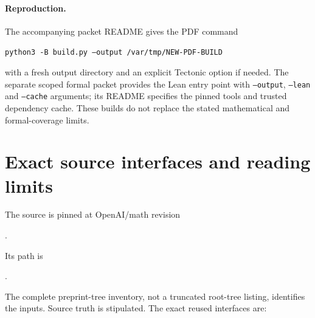 \documentclass[11pt]{article}
\theoremstyle{remark}\newtheorem{remark}[theorem]{Remark}
\numberwithin{equation}{section}
\begin{document}
\paragraph{Reproduction.}
The accompanying packet README gives the PDF command
\begin{center}\small
\texttt{python3 -B build.py --output /var/tmp/NEW-PDF-BUILD}
\end{center}
with a fresh output directory and an explicit Tectonic option if needed.
The separate scoped formal packet 
provides the Lean entry point with \texttt{--output}, \texttt{--lean}
and \texttt{--cache} arguments; its README specifies the pinned tools
and trusted dependency cache. These builds do not replace the stated
mathematical and formal-coverage limits.

\appendix
\section{Exact source interfaces and reading limits}\label{sec:source}
The source \cite{source} is pinned at OpenAI/math revision
\begin{center}\small{}.\end{center}
Its path is
\begin{center}\small{}.\end{center}
The complete preprint-tree inventory, not a truncated root-tree listing,
identifies the inputs. Source truth is stipulated. The exact reused
interfaces are:
\end{document}
